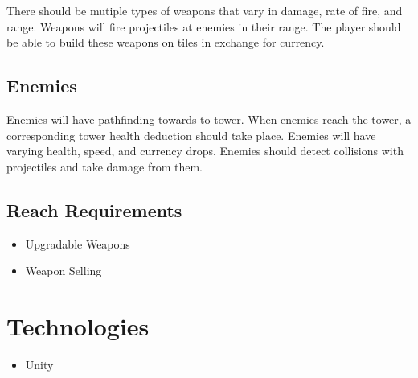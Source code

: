 \documentclass{article}
\begin{document}
There should be mutiple types of weapons that vary in damage, rate of fire, and range. Weapons will fire projectiles at enemies in their range. The player should be able to build these weapons on tiles in exchange for currency.

\subsection{Enemies}

Enemies will have pathfinding towards to tower. When enemies reach the tower, a corresponding tower health deduction should take place. Enemies will have varying health, speed, and currency drops. Enemies should detect collisions with projectiles and take damage from them.

\subsection{Reach Requirements}

\begin{itemize}
    \item Upgradable Weapons
    \item Weapon Selling
\end{itemize}

\section{Technologies}
\label{sec:Technologies}

\begin{itemize}
    \item Unity
\end{itemize}
\end{document}
